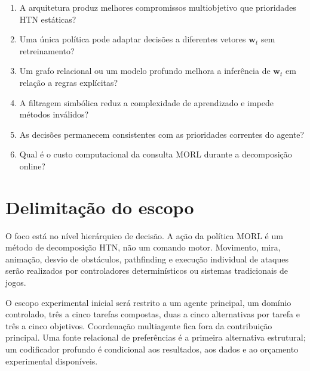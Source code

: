 \begin{enumerate}
\item A arquitetura produz melhores compromissos multiobjetivo que prioridades HTN estáticas?
\item Uma única política pode adaptar decisões a diferentes vetores $\mathbf{w}_t$ sem retreinamento?
\item Um grafo relacional ou um modelo profundo melhora a inferência de $\mathbf{w}_t$ em relação a regras explícitas?
\item A filtragem simbólica reduz a complexidade de aprendizado e impede métodos inválidos?
\item As decisões permanecem consistentes com as prioridades correntes do agente?
\item Qual é o custo computacional da consulta MORL durante a decomposição online?
\end{enumerate}

\section{Delimitação do escopo}

O foco está no nível hierárquico de decisão.
A ação da política MORL é um método de decomposição HTN, não um comando motor.
Movimento, mira, animação, desvio de obstáculos, pathfinding e execução individual
de ataques serão realizados por controladores determinísticos ou sistemas
tradicionais de jogos.

O escopo experimental inicial será restrito a um agente principal, um domínio
controlado, três a cinco tarefas compostas, duas a cinco alternativas por
tarefa e três a cinco objetivos.
Coordenação multiagente fica fora da contribuição principal.
Uma fonte relacional de preferências é a primeira alternativa estrutural; um
codificador profundo é condicional aos resultados, aos dados e ao orçamento
experimental disponíveis.
